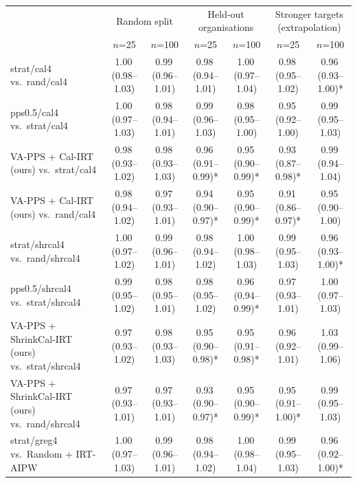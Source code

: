 \begin{tabular}{lcccccc}
\toprule
 & \multicolumn{2}{c}{Random split} & \multicolumn{2}{c}{Held-out organisations} & \multicolumn{2}{c}{Stronger targets (extrapolation)} \\
 & $n$=25 & $n$=100 & $n$=25 & $n$=100 & $n$=25 & $n$=100 \\
\midrule
strat/cal4 vs.\ rand/cal4 & 1.00\,\scriptsize(0.98--1.03) & 0.99\,\scriptsize(0.96--1.01) & 0.98\,\scriptsize(0.94--1.01) & 1.00\,\scriptsize(0.97--1.04) & 0.98\,\scriptsize(0.95--1.02) & 0.96\,\scriptsize(0.93--1.00)* \\
pps0.5/cal4 vs.\ strat/cal4 & 1.00\,\scriptsize(0.97--1.03) & 0.98\,\scriptsize(0.94--1.01) & 0.99\,\scriptsize(0.96--1.03) & 0.98\,\scriptsize(0.95--1.00) & 0.95\,\scriptsize(0.92--1.00) & 0.99\,\scriptsize(0.95--1.03) \\
VA-PPS + Cal-IRT (ours) vs.\ strat/cal4 & 0.98\,\scriptsize(0.93--1.02) & 0.98\,\scriptsize(0.93--1.03) & 0.96\,\scriptsize(0.91--0.99)* & 0.95\,\scriptsize(0.90--0.99)* & 0.93\,\scriptsize(0.87--0.98)* & 0.99\,\scriptsize(0.94--1.04) \\
VA-PPS + Cal-IRT (ours) vs.\ rand/cal4 & 0.98\,\scriptsize(0.94--1.02) & 0.97\,\scriptsize(0.93--1.01) & 0.94\,\scriptsize(0.90--0.97)* & 0.95\,\scriptsize(0.90--0.99)* & 0.91\,\scriptsize(0.86--0.97)* & 0.95\,\scriptsize(0.90--1.00) \\
strat/shrcal4 vs.\ rand/shrcal4 & 1.00\,\scriptsize(0.97--1.02) & 0.99\,\scriptsize(0.96--1.01) & 0.98\,\scriptsize(0.94--1.02) & 1.00\,\scriptsize(0.98--1.03) & 0.99\,\scriptsize(0.95--1.03) & 0.96\,\scriptsize(0.93--1.00)* \\
pps0.5/shrcal4 vs.\ strat/shrcal4 & 0.99\,\scriptsize(0.95--1.02) & 0.98\,\scriptsize(0.95--1.01) & 0.98\,\scriptsize(0.95--1.02) & 0.96\,\scriptsize(0.94--0.99)* & 0.97\,\scriptsize(0.93--1.01) & 1.00\,\scriptsize(0.97--1.03) \\
VA-PPS + ShrinkCal-IRT (ours) vs.\ strat/shrcal4 & 0.97\,\scriptsize(0.93--1.02) & 0.98\,\scriptsize(0.93--1.03) & 0.95\,\scriptsize(0.90--0.98)* & 0.95\,\scriptsize(0.91--0.98)* & 0.96\,\scriptsize(0.92--1.01) & 1.03\,\scriptsize(0.99--1.06) \\
VA-PPS + ShrinkCal-IRT (ours) vs.\ rand/shrcal4 & 0.97\,\scriptsize(0.93--1.01) & 0.97\,\scriptsize(0.93--1.01) & 0.93\,\scriptsize(0.90--0.97)* & 0.95\,\scriptsize(0.90--0.99)* & 0.95\,\scriptsize(0.91--1.00)* & 0.99\,\scriptsize(0.95--1.03) \\
strat/greg4 vs.\ Random + IRT-AIPW & 1.00\,\scriptsize(0.97--1.03) & 0.99\,\scriptsize(0.96--1.01) & 0.98\,\scriptsize(0.94--1.02) & 1.00\,\scriptsize(0.98--1.04) & 0.99\,\scriptsize(0.95--1.03) & 0.96\,\scriptsize(0.92--1.00)* \\

\end{tabular}
